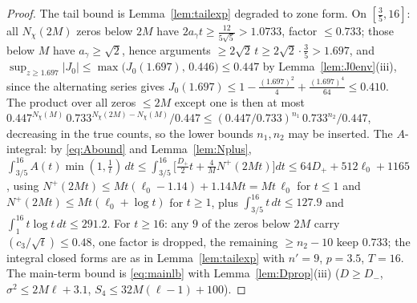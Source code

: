 \begin{proof}
The tail bound is Lemma~\ref{lem:tailexp} degraded to zone form. On
$[\tfrac35,16]$: all $N_\chi(2M)$ zeros below $2M$ have
$2a_\gamma t\ge\tfrac{12}{5\sqrt5}>1.0733$, factor $\le0.733$; those
below $M$ have $a_\gamma\ge\sqrt2$, hence arguments
$\ge2\sqrt2\,t\ge2\sqrt2\cdot\tfrac35>1.697$, and
$\sup_{z\ge1.697}|J_0|\le\max\bigl(J_0(1.697),\,0.446\bigr)
\le0.447$ by Lemma~\ref{lem:J0env}(iii), since the alternating
series gives $J_0(1.697)\le1-\tfrac{(1.697)^2}4
+\tfrac{(1.697)^4}{64}\le0.410$.
The product over all zeros $\le2M$ except one is then at most
$0.447^{N_\chi(M)}\,0.733^{N_\chi(2M)-N_\chi(M)}/0.447
\le(0.447/0.733)^{n_1}\,0.733^{n_2}/0.447$, decreasing in the true
counts, so the lower bounds $n_1,n_2$ may be inserted. The
$A$-integral: by \eqref{eq:Abound} and Lemma~\ref{lem:Nplus},
$\int_{3/5}^{16}A(t)\min(1,\tfrac1t)\,dt
\le\int_{3/5}^{16}\bigl[\tfrac{D_+}2t+\tfrac4MN^+(2Mt)\bigr]dt
\le64D_++512\ell_0+1165$, using
$N^+(2Mt)\le Mt(\ell_0-1.14)+1.14Mt=Mt\,\ell_0$ for $t\le1$ and
$N^+(2Mt)\le Mt(\ell_0+\log t)$ for $t\ge1$, plus
$\int_{3/5}^{16}t\,dt\le127.9$ and $\int_1^{16}t\log t\,dt\le291.2$.
For $t\ge16$: any $9$ of the zeros below $2M$ carry
$(c_3/\sqrt t)\le0.48$, one factor is dropped, the remaining
$\ge n_2-10$ keep $0.733$; the integral closed forms are as in
Lemma~\ref{lem:tailexp} with $n'=9$, $p=3.5$, $T=16$. The main-term
bound is \eqref{eq:mainlb} with Lemma~\ref{lem:Dprop}(iii)
($D\ge D_-$, $\sigma^2\le2M\ell+3.1$, $S_4\le32M(\ell-1)+100$).


\end{proof}
